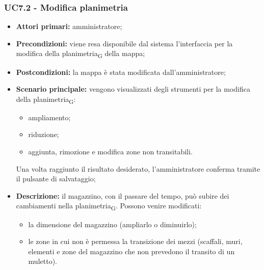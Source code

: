 \subsubsection{UC7.2 - Modifica planimetria}
\begin{itemize}
	\item 	\textbf{Attori primari:} amministratore;
	\item 	\textbf{Precondizioni:} viene resa disponibile dal sistema l'interfaccia per la modifica della planimetria\textsubscript{G} della mappa;
	\item 	\textbf{Postcondizioni:} la mappa è stata modificata dall'amministratore;
	\item 	\textbf{Scenario principale:} vengono visualizzati degli strumenti per la modifica della planimetria\textsubscript{G}:
	\begin{itemize}
		\item ampliamento;
		\item riduzione;
		\item aggiunta, rimozione e modifica zone non transitabili.
	\end{itemize}
	Una volta raggiunto il risultato desiderato, l'amministratore conferma tramite il pulsante di salvataggio;
	\item 	\textbf{Descrizione:} il magazzino, con il passare del tempo, può subire dei cambiamenti nella planimetria\textsubscript{G}. Possono venire modificati:
	\begin{itemize}
		\item la dimensione del magazzino (ampliarlo o diminuirlo);
		\item le zone in cui non è permessa la transizione dei mezzi (scaffali, muri, elementi e zone del magazzino che non prevedono il transito di un muletto).
	\end{itemize}
\end{itemize}

